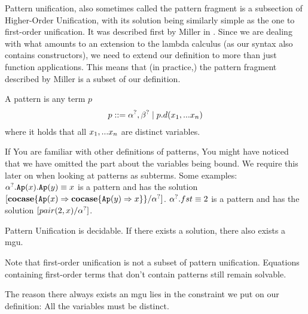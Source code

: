 \documentclass[twoside,12pt,a4paper]{article}
\begin{document}
Pattern unification, also sometimes called the pattern fragment
is a subsection of Higher-Order Unification,
with its solution being similarly simple as the one to first-order unification.
It was described first by Miller in \cite{10.1093/logcom/1.4.497}.
Since we are dealing with what amounts to an extension to the lambda calculus (as our syntax also contains constructors), we need to extend our definition to more than just function applications. 
This means that (in practice,) the pattern fragment described by Miller is a subset of our definition.

\begin{definition}[Pattern]
    A pattern is any term $p$ 
    \begin{align*}
        p ::= \alpha^?, \beta^? \;|\; p.d(x_1,...x_n)
    \end{align*}
    where it holds that all $x_1,...x_n$ are distinct variables.
\end{definition}

If You are familiar with other definitions of patterns, You might have noticed that 
we have omitted the part about the variables being bound. We require this later on when looking at patterns as subterms.
Some examples:
$\alpha^?.\texttt{Ap}(x).\texttt{Ap}(y)\equiv x$ is a pattern and has the solution $[\textbf{cocase}\{\texttt{Ap}(x)\Rightarrow\textbf{cocase}\{\texttt{Ap}(y)\Rightarrow x\}\}/\alpha^?]$.
$\alpha^?.fst \equiv 2$ is a pattern and has the solution $[pair(2,x)/\alpha^?]$.


\begin{theorem}
    Pattern Unification is decidable. If there exists a solution, there also exists a mgu.
\end{theorem}

Note that first-order unification is not a subset of pattern unification. 
Equations containing first-order terms that don't contain patterns still remain solvable.

The reason there always exists an mgu lies in the constraint we put on our definition: All the variables must be distinct. 
\end{document}
